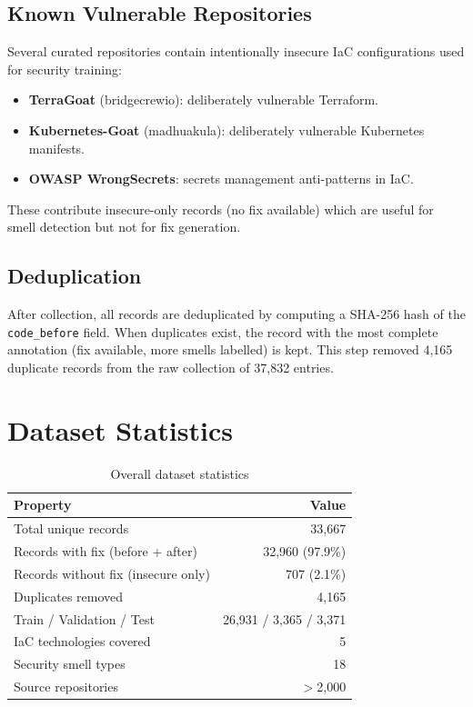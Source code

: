 \documentclass[11pt,a4paper]{article}
\begin{document}
\subsection{Known Vulnerable Repositories}

Several curated repositories contain intentionally insecure IaC configurations used for security training:
\begin{itemize}[leftmargin=1.2cm]
  \item \textbf{TerraGoat} (bridgecrewio): deliberately vulnerable Terraform.
  \item \textbf{Kubernetes-Goat} (madhuakula): deliberately vulnerable Kubernetes manifests.
  \item \textbf{OWASP WrongSecrets}: secrets management anti-patterns in IaC.
\end{itemize}

These contribute insecure-only records (no fix available) which are useful for smell detection but not for fix generation.

\subsection{Deduplication}

After collection, all records are deduplicated by computing a SHA-256 hash of the \texttt{code\_before} field. When duplicates exist, the record with the most complete annotation (fix available, more smells labelled) is kept. This step removed 4,165 duplicate records from the raw collection of 37,832 entries.

\section{Dataset Statistics}

\begin{table}[h]
\centering
\caption{Overall dataset statistics}
\begin{tabular}{@{}lr@{}}
\toprule
\textbf{Property} & \textbf{Value} \\
\midrule
Total unique records            & 33,667 \\
Records with fix (before + after) & 32,960 (97.9\%) \\
Records without fix (insecure only) & 707 (2.1\%) \\
Duplicates removed              & 4,165 \\
Train / Validation / Test       & 26,931 / 3,365 / 3,371 \\
IaC technologies covered        & 5 \\
Security smell types            & 18 \\
Source repositories             & $>$2,000 \\
\bottomrule
\end{tabular}
\end{table}
\end{document}
